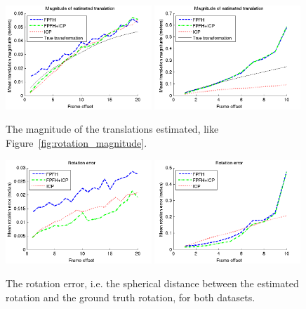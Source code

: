 \documentclass[a4paper]{article}
\begin{document}
\begin{figure}[H]
    \centering
        \includegraphics[width=0.49\textwidth]{ims/xyzMagnitudeofestimatedtranslation.png}
        \includegraphics[width=0.49\textwidth]{ims/deskMagnitudeofestimatedtranslation.png}
    \caption{The magnitude of the translations estimated, like Figure~\ref{fig:rotation_magnitude}. }
    \label{fig:translation_magnitude}
\end{figure}


\begin{figure}[H]
    \centering
        \includegraphics[width=0.49\textwidth]{ims/xyzRotationerror.png}
        \includegraphics[width=0.49\textwidth]{ims/deskRotationerror.png}
    \caption{The rotation error, i.e. the spherical distance between the estimated rotation and the ground truth rotation, for both datasets.}
    \label{fig:rotation_error}
\end{figure}
\end{document}
